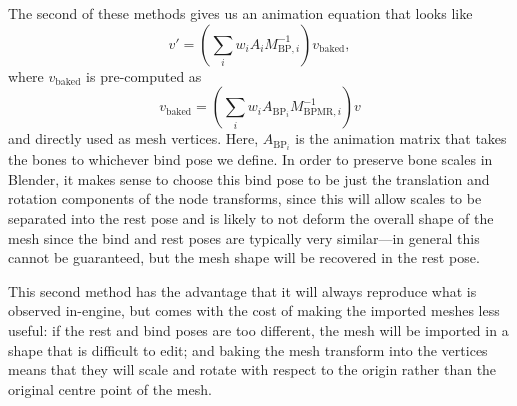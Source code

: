\documentclass{article}
\begin{document}
The second of these methods gives us an animation equation that looks like
\begin{equation}
v' = \left( \sum_i w_i A_i M_{\mathrm{BP}, i}^{-1} \right) v_\mathrm{baked},
\end{equation}
where $v_\mathrm{baked}$ is pre-computed as
\begin{equation}
v_\mathrm{baked} = \left( \sum_i w_i A_{\mathrm{BP}_i} M_{\mathrm{BPMR}, i}^{-1} \right) v
\end{equation}
and directly used as mesh vertices. Here, $A_{\mathrm{BP}_i}$ is the animation matrix that takes the bones to whichever bind pose we define. In order to preserve bone scales in Blender, it makes sense to choose this bind pose to be just the translation and rotation components of the node transforms, since this will allow scales to be separated into the rest pose and is likely to not deform the overall shape of the mesh since the bind and rest poses are typically very similar---in general this cannot be guaranteed, but the mesh shape will be recovered in the rest pose.

This second method has the advantage that it will always reproduce what is observed in-engine, but comes with the cost of making the imported meshes less useful: if the rest and bind poses are too different, the mesh will be imported in a shape that is difficult to edit; and baking the mesh transform into the vertices means that they will scale and rotate with respect to the origin rather than the original centre point of the mesh.
\end{document}

